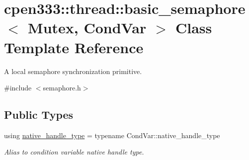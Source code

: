 \hypertarget{classcpen333_1_1thread_1_1basic__semaphore}{}\section{cpen333\+:\+:thread\+:\+:basic\+\_\+semaphore$<$ Mutex, Cond\+Var $>$ Class Template Reference}
\label{classcpen333_1_1thread_1_1basic__semaphore}


A local semaphore synchronization primitive.  




{\ttfamily \#include $<$semaphore.\+h$>$}

\subsection*{Public Types}
\begin{DoxyCompactItemize}
\item 
\mbox{\label{classcpen333_1_1thread_1_1basic__semaphore_a22e2293b6882f2bf4312aeb167a0b409}} 
using \hyperlink{classcpen333_1_1thread_1_1basic__semaphore_a22e2293b6882f2bf4312aeb167a0b409}{native\+\_\+handle\+\_\+type} = typename Cond\+Var\+::native\+\_\+handle\+\_\+type
\begin{DoxyCompactList}\small\item\em Alias to condition variable native handle type. \end{DoxyCompactList}\end{DoxyCompactItemize}
